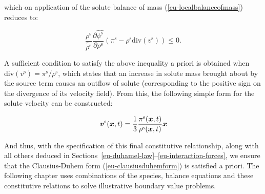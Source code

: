 \noindent which on application of the solute balance of mass
(\ref{eu-localbalanceofmass}) reduces to:

\begin{equation*}
\frac{\rho^{\mathrm{s}}}{\tilde{\rho^{\mathrm{s}}}}
\frac{\partial \hat{\psi^{\mathrm{s}}}}{\partial \rho^{\mathrm{s}}}
\left(\pi^{\mathrm{s}}- \rho^{\mathrm{s}} \mathrm{div}\left( v^{\mathrm{s}}
\right)\right) 
\leq 0.
\end{equation*}

\noindent A sufficient condition to satisfy the above inequality a
priori is obtained when $\mathrm{div}\left( v^{\mathrm{s}} \right) =
\pi^{\mathrm{s}}/\rho^{\mathrm{s}}$, which states that an increase in
solute mass brought about by the source term causes an outflow of
solute (corresponding to the positive sign on the divergence of its
velocity field). From this, the following simple form for the solute
velocity can be constructed:

\begin{equation}
\mbox{\boldmath$ v$}^{\mathrm{s}}(\mbox{\boldmath$ x$},t) = \frac{1}{3}
\frac{\pi^{\mathrm{s}}(\mbox{\boldmath$ x$},t)}{\rho^{\mathrm{s}}(\mbox{\boldmath$ x$},t)} \mbox{\boldmath$ x$}
\end{equation}

And thus, with the specification of this final constitutive
relationship, along with all others deduced in
Sections~\ref{eu-duhamel-law}--\ref{eu-interaction-forces}, we 
ensure that the Clausius-Duhem form (\ref{eu-clausiusduhemform}) is
satisfied a priori. The following chapter uses combinations of the
species, balance equations and these constitutive relations to solve
illustrative boundary value problems.

%

